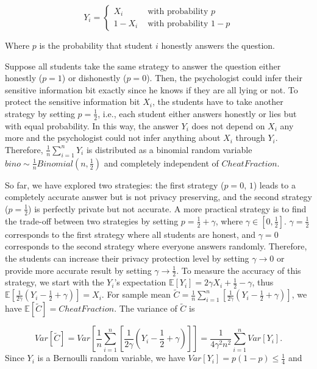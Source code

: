 \begin{equation}
    Y_{i}=
    \begin{cases}X_{i}   & \text { with probability } p   \\
             1-X_{i} & \text { with probability } 1-p
    \end{cases}
\end{equation}

Where $p$ is the probability that student $i$ honestly answers the question.

Suppose all students take the same strategy to answer the question either honestly ($p=1$) or dishonestly ($p=0$). Then, the psychologist could infer their sensitive information bit exactly since he knows if they are all lying or not. To protect the sensitive information bit $X_{i}$, the students have to take another strategy by setting $p=\frac{1}{2}$, i.e., each student either answers honestly or lies but with equal probability. In this way, the answer $Y_{i}$ does not depend on $X_{i}$ any more and the psychologist could not infer anything about $X_{i}$ through $Y_{i}$. Therefore, $\frac{1}{n}\sum ^{n}_{i=1}Y_{i}$  is distributed as a binomial random variable $bino \sim \frac{1}{n} Binomial\left(n,\frac{1}{2}\right)$ and completely independent of $CheatFraction$.

So far, we have explored two strategies: the first strategy ($p=0$, $1$) leads to a completely accurate answer but is not privacy preserving, and the second strategy ($p=\frac{1}{2}$) is perfectly private but not accurate. A more practical strategy is to find the trade-off between two strategies by setting $p=\frac{1}{2}+\gamma$, where $\gamma \in \left[ 0 ,\frac{1}{2}\right] $. $\gamma=\frac{1}{2}$ corresponds to the first strategy where all students are honest, and $\gamma=0$ corresponds to the second strategy where everyone answers randomly. Therefore, the students can increase their privacy protection level by setting $\gamma \to 0$ or provide more accurate result by setting $\gamma \to \frac{1}{2}$.
To measure the accuracy of this strategy, we start with the $Y_{i}$’s expectation $\mathbb{E}\left[ Y_{i}\right] =2\gamma X_{i}+\frac{1}{2}-\gamma$, thus $\mathbb{E} \left[ \frac{1}{2\gamma } \left(Y_{i}-\frac{1}{2}+\gamma \right) \right] =X_{i}$. For sample mean $\tilde{C}=\frac{1}{n}\sum ^{n}_{i=1}\left[ \frac{1}{2\gamma}\left( Y_{i}-\frac{1}{2}+\gamma \right) \right] $, we have $\mathbb{E}\left[ \tilde{C}\right] =CheatFraction$. The variance of $\tilde{C}$ is

\begin{equation}
    Var\left[ \tilde{C}\right] =Var\left[\frac{1}{n}\sum ^{n}_{i= 1}\left[ \frac{1}{2\gamma }\left( Y_{i}-\frac{1}{2}+\gamma \right) \right]\right] =\frac{1}{4\gamma^{2}n^{2}}\sum ^{n}_{i=1}Var\left[ Y_{i}\right].
\end{equation}
Since $Y_{i}$ is a Bernoulli random variable, we have $Var\left[Y_i\right] =p\left(1-p\right)\leq\frac{1}{4} $ and

